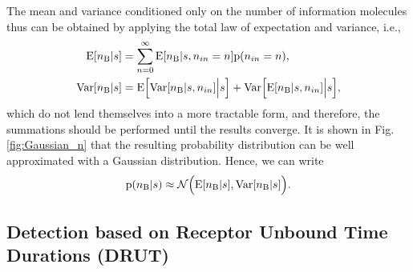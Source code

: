 \documentclass[twocolumn]{IEEEtran}
\newcommand{\p}{\mathrm{p}}
\newcommand{\B}{\mathrm{B}}
\newcommand{\E}{\mathrm{E}}
\newcommand{\Var}{\mathrm{Var}}
\begin{document}
%
The mean and variance conditioned only on the number of information molecules thus can be obtained by applying the total law of expectation and variance, i.e., 
\begin{align}
\E[n_\B|s] &=   \sum_{n=0}^\infty \E[n_\B|s,n_{in} = n] \p(n_{in} = n),  \\ \nonumber
\Var[n_\B|s] &= \E\Bigl[\Var[n_\B|s, n_{in}]\Big|s \Bigr]  + \Var\Bigl[\E[n_\B|s, n_{in}]\Big|s \Bigr],  \label{eq:numberofboundMeanAndVariance}
\end{align}
which do not lend themselves into a more tractable form, and therefore, the summations should be performed until the results converge. It is shown in Fig. \ref{fig:Gaussian_n} that the resulting probability distribution can be well approximated with a Gaussian distribution. Hence, we can write 
\begin{equation}
\p(n_\B|s) \approx \mathcal{N}\Bigl(\E[n_\B|s] , \Var[n_\B|s] \Bigr). \label{eq:DNBRpdf} 
\end{equation}


\subsection{Detection based on Receptor Unbound Time Durations  (DRUT)}
\end{document}
